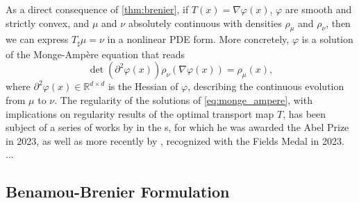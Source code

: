 
As a direct consequence of \cref{thm:brenier}, if $T(x) = \nabla \varphi(x)$, $\varphi$ are smooth and strictly convex, and $\mu$ and $\nu$ absolutely continuous with densities $\rho_\mu$ and $\rho_\nu$, then we can express $T_\sharp \mu = \nu$ in a nonlinear \acrfull{PDE} form. More concretely, $\varphi$ is a solution of the Monge-Amp{\`e}re equation that reads
\begin{equation} \label{eq:monge_ampere}
	\operatorname{det}\left(\partial^2 \varphi(x)\right) \rho_\nu(\nabla \varphi(x))=\rho_\mu(x),
\end{equation}
where $\partial^2 \varphi(x) \in \mathbb{R}^{d \times d}$ is the Hessian of $\varphi$, describing the continuous evolution from $\mu$ to $\nu$.
The regularity of the solutions of \eqref{eq:monge_ampere}, with implications on regularity results of the optimal transport map $T$, has been subject of a series of works by \citeauthor{caffarelli1990interior} in the \citeyear{caffarelli1990interior}s, for which he was awarded the Abel Prize in 2023, as well as more recently by \citeauthor{figalli2017monge}, recognized with the Fields Medal in 2023.
...

\subsection{Benamou-Brenier Formulation} \label{sec:background_benamou_brenier}

